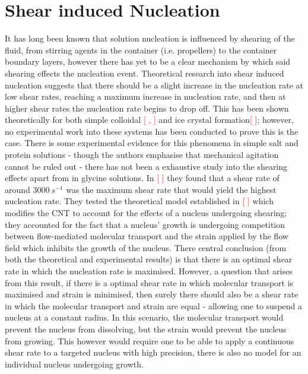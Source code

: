 \documentclass[a4paper,oneside,11pt]{book}
\begin{document}
\section{Shear induced Nucleation}
It has long been known that solution nucleation is influenced by shearing of the fluid, from stirring agents in the container (i.e. propellers) to the container boundary layers, however there has yet to be a clear mechanism by which said shearing effects the nucleation event. Theoretical research into shear induced nucleation suggests that there should be a slight increase in the nucleation rate at low shear rates, reaching a maximum increase in nucleation rate, and then at higher shear rates the nucleation rate begins to drop off. This has been shown theoretically for both simple colloidal \textcolor{red}{[ , ]}  and ice crystal formation\textcolor{red}{[ ]}; however, no experimental work into these systems has been conducted to prove this is the case.  There is some experimental evidence for this phenomena in simple salt and protein solutions - though the authors emphasise that mechanical agitation cannot be ruled out - there has not been a exhaustive study into the shearing effects apart from in glycine solutions. In \textcolor{red}{[ ]} they found that a shear rate of around $3000\ s^{-1}$ was the maximum shear rate that would yield the highest nucleation rate. They tested the theoretical model established in \textcolor{red}{[ ]} which modifies the CNT to account for the effects of a nucleus undergoing shearing; they accounted for the fact that a nucleus' growth is undergoing competition between flow-mediated molecular transport and the strain applied by the flow field which inhibits the growth of the nucleus. There central conclusion (from both the theoretical and experimental results) is that there is an optimal shear rate in which the nucleation rate is maximised. However, a question that arises from this result, if there is a optimal shear rate in which molecular transport is maximised and strain is minimised, then surely there should also be a shear rate in which the molecular transport and strain are equal - allowing one to suspend a nucleus at a constant radius. In this scenario, the molecular transport would prevent the nucleus from dissolving, but the strain would prevent the nucleus from growing. This however would require one to be able to apply a continuous shear rate to a targeted nucleus with high precision, there is also no model for an individual nucleus undergoing growth. 
\end{document}
